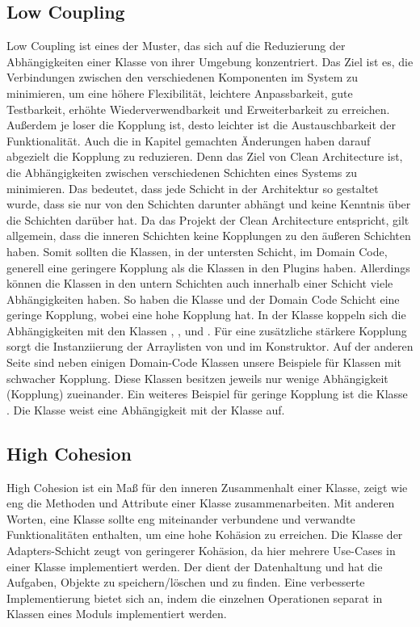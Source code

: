 \subsection{Low Coupling}
Low Coupling ist eines der Muster, das sich auf die Reduzierung der Abhängigkeiten einer Klasse von ihrer Umgebung konzentriert. Das Ziel ist es, die Verbindungen zwischen den verschiedenen Komponenten im System zu minimieren, um eine höhere Flexibilität, leichtere Anpassbarkeit, gute Testbarkeit, erhöhte Wiederverwendbarkeit und Erweiterbarkeit zu erreichen. Außerdem je loser die Kopplung ist, desto leichter ist die Austauschbarkeit der Funktionalität.
Auch die in Kapitel  gemachten Änderungen haben darauf abgezielt die Kopplung zu reduzieren. Denn das Ziel von Clean Architecture ist, die Abhängigkeiten zwischen verschiedenen Schichten eines Systems zu minimieren. Das bedeutet, dass jede Schicht in der Architektur so gestaltet wurde, dass sie nur von den Schichten darunter abhängt und keine Kenntnis über die Schichten darüber hat. Da das Projekt der Clean Architecture entspricht, gilt allgemein, dass die inneren Schichten keine Kopplungen zu den äußeren Schichten haben. 
Somit sollten die Klassen, in der untersten Schicht, im Domain Code, generell eine geringere Kopplung als die Klassen in den Plugins haben. Allerdings können die Klassen in den untern Schichten auch innerhalb einer Schicht viele Abhängigkeiten haben. So haben die Klasse  und  der Domain Code Schicht eine geringe Kopplung, wobei  eine hohe Kopplung hat.  
In der Klasse  koppeln sich die Abhängigkeiten mit den Klassen , ,  und . Für eine zusätzliche stärkere Kopplung sorgt die Instanziierung der Arraylisten von  und  im Konstruktor.
Auf der anderen Seite sind neben einigen Domain-Code Klassen unsere \href{https://github.com/MichaelaHaag/RezeptApp/blob/main/0-Plugins/src/main/java/de/rezeptapp/plugins/gui}{} Beispiele für Klassen mit schwacher Kopplung. Diese Klassen besitzen jeweils nur wenige Abhängigkeit (Kopplung) zueinander. 
Ein weiteres Beispiel für geringe Kopplung ist die Klasse . Die Klasse weist eine Abhängigkeit mit der Klasse  auf.

\subsection{High Cohesion}
High Cohesion  ist ein Maß für den inneren Zusammenhalt einer Klasse, zeigt wie eng die Methoden und Attribute einer Klasse zusammenarbeiten. Mit anderen Worten, eine Klasse sollte eng miteinander verbundene und verwandte Funktionalitäten enthalten, um eine hohe Kohäsion zu erreichen. 
Die Klasse  der Adapters-Schicht zeugt von geringerer Kohäsion, da hier mehrere Use-Cases in einer Klasse implementiert werden. Der  dient der Datenhaltung und hat die Aufgaben, Objekte zu speichern/löschen und zu finden. Eine verbesserte Implementierung bietet sich an, indem die einzelnen Operationen separat in Klassen eines Moduls implementiert werden.

